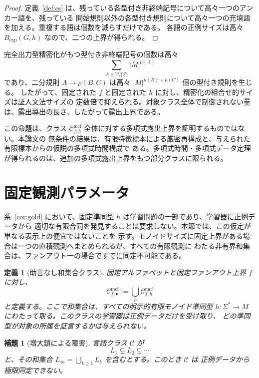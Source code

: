 \documentclass[11pt,a4paper]{ltjsarticle}
\newtheorem{lemma}[theorem]{補題}
\newtheorem{definition}[theorem]{定義}
\theoremstyle{remark}
\newcommand{\Cmcf}[2]{\mathcal{C}^{\mathrm{mcf}}_{#1,#2}}
\begin{document}
\begin{proof}
定義~\ref{def:cs} は、残っている各型付き非終端記号について高々一つのアンカー語を、残っている
開始規則以外の各型付き規則について高々一つの充填語を加える。重複する語は個数を減らすだけである。
各語の正例サイズは高々 \(B_{\mathrm{exp}}(G,h)\) なので、二つの上界が得られる。
\end{proof}

完全出力型精密化がもつ型付き非終端記号の個数は高々
\[
  \sum_{A\in V\setminus\{S\}} |M|^{\mu(A)}
\]
であり、二分規則 \(A\to\rho(B,C)\) は高々 \(|M|^{\mu(B)+\mu(C)}\) 個の型付き規則を生じる。
したがって、固定された \(f\) と固定された \(h\) に対し、精密化の組合せ的サイズは証人文法サイズの
定数倍で抑えられる。対象クラス全体で制御されない量は、露出導出の長さ、したがって露出上界である。

この命題は、クラス \(\Cmcf{f}{h}\) 全体に対する多項式露出上界を証明するものではない。本論文の
無条件の結果は、有限特徴標本による厳密再構成と、与えられた有限標本からの仮説の多項式時間構成で
ある。多項式時間・多項式データ定理が得られるのは、追加の多項式露出上界をもつ部分クラスに限られる。


\section{固定観測パラメータ}
\label{sec:fixed-observation}

系~\ref{cor:gold} において、固定準同型 \(h\) は学習問題の一部であり、学習器に正例データから
適切な有限合同を発見することは要求しない。本節では、この仮定が単なる表示上の便宜ではないことを
示す。モノイドサイズに固定上界がある場合は一つの直積観測へまとめられるが、すべての有限観測に
わたる非有界和集合は、ファンアウト一の場合ですでに同定不可能である。

\begin{definition}[助言なし和集合クラス]
\label{def:no-advice-union}
固定アルファベットと固定ファンアウト上界 \(f\) に対し、
\[
  \Cmcf{f}{\bullet}:=\bigcup_h \Cmcf{f}{h}
\]
と定義する。ここで和集合は、すべての明示的有限モノイド準同型
\(h\colon\Sigma^*\to M\) にわたって取る。このクラスの学習器は正例データだけを受け取り、
どの準同型が対象の所属を証言するかは与えられない。
\end{definition}

\begin{lemma}[増大鎖による障害]
\label{lem:ascending-chain-obstruction}
言語クラス \(\mathcal C\) が
\[
  L_1\subsetneq L_2\subsetneq\cdots
\]
と、その和集合 \(L_\infty=\bigcup_{k\ge1}L_k\) を含むとする。このとき \(\mathcal C\) は
正例データから極限同定できない。
\end{lemma}
\end{document}
